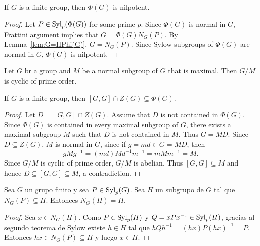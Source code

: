 \begin{theorem}[Frattini]
	\label{theorem:Frattini}
	If $G$ is a finite group, then $\Phi(G)$ is nilpotent. 
\end{theorem}

\begin{proof}
	Let $P\in\mathrm{Syl}_p(\Phi(G))$ for some prime $p$. Since $\Phi(G)$ is normal in
	$G$, Frattini argument implies that 
	$G=\Phi(G)N_G(P)$. By Lemma~\ref{lem:G=HPhi(G)},
	$G=N_G(P)$. Since Sylow subgroups of $\Phi(G)$ are normal in $G$,
	$\Phi(G)$ is nilpotent.
\end{proof}

\begin{exercise}
	\label{exercise:G/M}
	Let $G$ br a group and $M$ be a normal subgroup of $G$ that is maximal. Then
	$G/M$ is cyclic of prime order.
\end{exercise}


\begin{theorem}
	\label{thm:Gaschutz}
	If $G$ is a finite group, then $[G,G]\cap Z(G)\subseteq\Phi(G)$.
\end{theorem}

\begin{proof}
	Let $D=[G,G]\cap Z(G)$. Assume that $D$ is not contained in $\Phi(G)$.
	Since $\Phi(G)$ is contained in every maximal subgroup of $G$, there exists a maximal subgroup $M$ 
	such that $D$ is not contained in $M$. Thus $G=MD$. Since $D\subseteq Z(G)$, $M$ is normal in $G$, since if  
	$g=md\in G=MD$, then 
	\[
		gMg^{-1}=(md)Md^{-1}m^{-1}=mMm^{-1}=M.
	\]
	Since $G/M$ is cyclic of prime order, $G/M$ is abelian. Thus $[G,G]\subseteq M$ and hence 
	$D\subseteq [G,G]\subseteq M$, a contradiction. 
\end{proof}

\begin{lemma}
	\label{lemma:N_G(H)=H}
	Sea $G$ un grupo finito y sea $P\in\mathrm{Syl}_p(G)$. Sea $H$ un subgrupo de $G$
	tal que $N_G(P)\subseteq H$. Entonces $N_G(H)=H$.
\end{lemma}

\begin{proof}
	Sea $x\in N_G(H)$. Como $P\in\mathrm{Syl}_p(H)$ y $Q=xPx^{-1}\in\mathrm{Syl}_p(H)$, gracias al segundo teorema de Sylow 
	existe
	$h\in H$ tal que $hQh^{-1}=(hx)P(hx)^{-1}=P$. Entonces $hx\in
	N_G(P)\subseteq H$ y luego $x\in H$. 
\end{proof}

